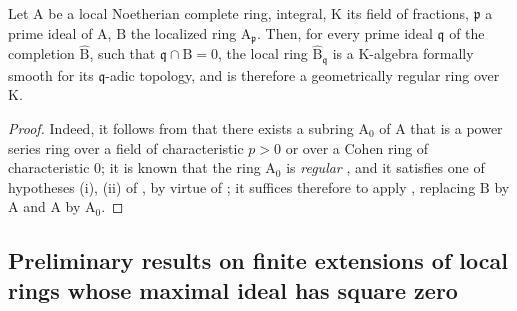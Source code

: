 \begin{corollary}[22.3.4]
\label{0.22.3.4}
Let $\mathrm{A}$ be a local Noetherian complete ring, integral, $\mathrm{K}$ its field of fractions, $\mathfrak{p}$ a prime ideal of $\mathrm{A}$, $\mathrm{B}$ the localized ring $\mathrm{A}_\mathfrak{p}$.
Then, for every prime ideal $\mathfrak{q}$ of the completion $\widehat{\mathrm{B}}$, such that $\mathfrak{q}\cap\mathrm{B}=0$, the local ring $\widehat{\mathrm{B}}_\mathfrak{q}$ is a $\mathrm{K}$-algebra formally smooth for its $\mathfrak{q}$-adic topology, and is therefore a geometrically regular ring over $\mathrm{K}$.
\end{corollary}

\begin{proof}
Indeed, it follows from  that there exists a subring $\mathrm{A}_0$ of $\mathrm{A}$ that is a power series ring over a field of characteristic $p>0$ or over a Cohen ring of characteristic $0$; it is known that the ring $\mathrm{A}_0$ is \emph{regular} , and it satisfies one of hypotheses (i), (ii) of , by virtue of ; it suffices therefore to apply , replacing $\mathrm{B}$ by $\mathrm{A}$ and $\mathrm{A}$ by $\mathrm{A}_0$.
\end{proof}

\subsection{Preliminary results on finite extensions of local rings whose maximal ideal has square zero}
\label{subsection:0.22.4}

